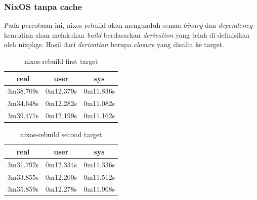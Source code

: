\documentclass[10pt,]{report}
\begin{document}
\begin{adjustwidth}{20pt}{}
	\subsubsection{NixOS tanpa cache}
	\begin{adjustwidth}{20pt}{}
		Pada percobaan ini, nixos-rebuild akan mengunduh semua \textit{binary} dan
		\textit{dependency} kemudian akan melakukan \textit{build} berdasarkan
		\textit{derivation} yang telah di definisikan oleh nixpkgs. Hasil dari
		\textit{derivation} berupa \textit{closure} yang disalin ke target.
	\end{adjustwidth}
	\begin{table}[H]
		\caption{nixos-rebuild first target}
		\begin{center}
			\begin{tabular}[c]{|c|c|c|}
				\hline
				\multicolumn{1}{|c|}{\textbf{real}} &
				\multicolumn{1}{c|}{\textbf{user}}  &
				\multicolumn{1}{c|}{\textbf{sys}}                           \\
				\hline
				3m38.709s                           & 0m12.379s & 0m11.836s \\
				\hline
				3m34.648s                           & 0m12.282s & 0m11.082s \\
				\hline
				3m39.477s                           & 0m12.199s & 0m11.162s \\
				\hline
			\end{tabular}
		\end{center}
	\end{table}
	\vspace{-5mm}
	\begin{table}[H]
		\caption{nixos-rebuild second target}
		\begin{center}
			\begin{tabular}[c]{|c|c|c|}
				\hline
				\multicolumn{1}{|c|}{\textbf{real}} &
				\multicolumn{1}{c|}{\textbf{user}}  &
				\multicolumn{1}{c|}{\textbf{sys}}                           \\
				\hline
				3m31.792s                           & 0m12.334s & 0m11.336s \\
				\hline
				3m33.855s                           & 0m12.200s & 0m11.512s \\
				\hline
				3m35.859s                           & 0m12.278s & 0m11.968s \\
				\hline
			\end{tabular}
		\end{center}
	\end{table}

\end{adjustwidth}
\end{document}
